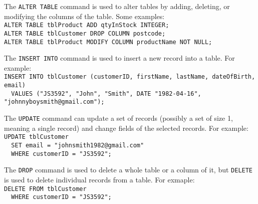 \documentclass[../main.tex]{subfile}
\begin{document}

The \texttt{ALTER TABLE} command is used to alter tables by adding, deleting, or modifying the columns of the table. Some examples:\\
\texttt{ALTER TABLE tblProduct ADD qtyInStock INTEGER;}\\
\texttt{ALTER TABLE tblCustomer DROP COLUMN postcode;}\\
\texttt{ALTER TABLE tblProduct MODIFY COLUMN productName NOT NULL;}


The \texttt{INSERT INTO} command is used to insert a new record into a table. For example:\\
\texttt{INSERT INTO tblCustomer (customerID, firstName, lastName, dateOfBirth, email)\\
  VALUES ("JS3592", "John", "Smith", DATE "1982-04-16", "johnnyboysmith@gmail.com");}

The \texttt{UPDATE} command can update a set of records (possibly a set of size 1, meaning a single record) and change fields of the selected records. For example:\\
\texttt{UPDATE tblCustomer\\
  SET email = "johnsmith1982@gmail.com"\\
  WHERE customerID = "JS3592";}

The \texttt{DROP} command is used to delete a whole table or a column of it, but \texttt{DELETE} is used to delete individual records from a table. For exmaple:\\
\texttt{DELETE FROM tblCustomer\\
  WHERE customerID = "JS3592";}
\end{document}
